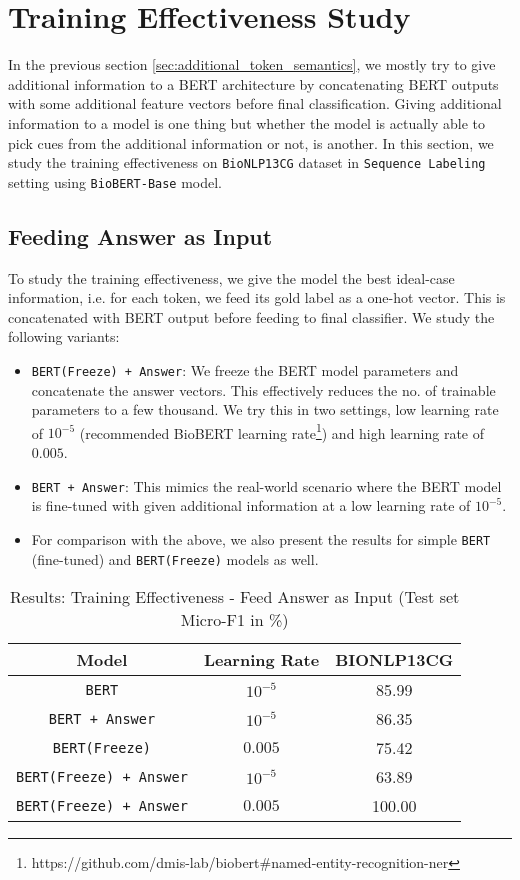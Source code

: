 \section{Training Effectiveness Study}
In the previous section \ref{sec:additional_token_semantics}, we mostly try to give additional information to a BERT architecture by concatenating BERT outputs with some additional feature vectors before final classification. Giving additional information to a model is one thing but whether the model is actually able to pick cues from the additional information or not, is another. In this section, we study the training effectiveness on \texttt{BioNLP13CG} dataset in \texttt{Sequence Labeling} setting using \texttt{BioBERT-Base} model.

\subsection{Feeding Answer as Input}

To study the training effectiveness, we give the model the best ideal-case information, i.e. for each token, we feed its gold label as a one-hot vector. This is concatenated with BERT output before feeding to final classifier. We study the following variants:

\begin{itemize}
    \item \texttt{BERT(Freeze) + Answer}: We freeze the BERT model parameters and concatenate the answer vectors. This effectively reduces the no. of trainable parameters to a few thousand. We try this in two settings, low learning rate of $10^{-5}$ (recommended BioBERT learning rate\footnote{https://github.com/dmis-lab/biobert\#named-entity-recognition-ner}) and high learning rate of $0.005$.
    
    \item \texttt{BERT + Answer}: This mimics the real-world scenario where the BERT model is fine-tuned with given additional information at a low learning rate of $10^{-5}$.
    
    \item For comparison with the above, we also present the results for simple \texttt{BERT} (fine-tuned) and \texttt{BERT(Freeze)} models as well.
\end{itemize}

\begin{table}[h!]
\centering
\begin{tabular}{|c|c|c|}\hline
	\textbf{Model} & \textbf{Learning Rate} & \textbf{BIONLP13CG}\\\hline
	\texttt{BERT} & $10^{-5}$ & 85.99\\\hline
	\texttt{BERT + Answer} & $10^{-5}$ & 86.35\\\hline
	\texttt{BERT(Freeze)} & $0.005$ & 75.42\\\hline
	\texttt{BERT(Freeze) + Answer} & $10^{-5}$ & 63.89\\\hline
	\texttt{BERT(Freeze) + Answer} & $0.005$ & 100.00\\\hline
	\end{tabular}
    \caption{Results: Training Effectiveness - Feed Answer as Input (Test set Micro-F1 in \%)}
    \label{tab:res_training_ans_input}
\end{table}

